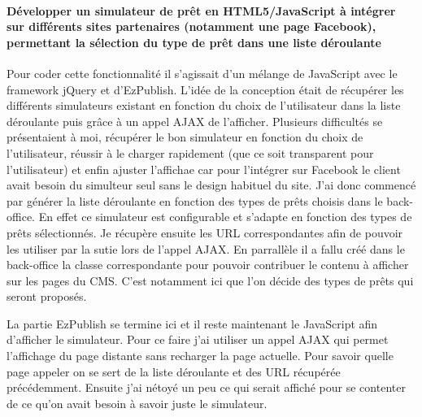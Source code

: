 \documentclass[a4paper,11pt,twoside]{report}
\begin{document}
      \paragraph*{Développer un simulateur de prêt en HTML5/JavaScript à intégrer sur différents sites partenaires (notamment une page Facebook), permettant la sélection du type de prêt dans une liste déroulante}
      Pour coder cette fonctionnalité il s'agissait d'un mélange de JavaScript avec le framework jQuery et d'EzPublish. L'idée de la conception était de récupérer les différents simulateurs existant en fonction du choix de l'utilisateur dans la liste déroulante puis grâce à un appel AJAX de l'afficher. Plusieurs difficultés se présentaient à moi, récupérer le bon simulateur en fonction du choix de l'utilisateur, réussir à le charger rapidement (que ce soit transparent pour l'utilisateur) et enfin ajuster l'affichae car pour l'intégrer sur Facebook le client avait besoin du simulteur seul sans le design habituel du site. J'ai donc commencé par générer la liste déroulante en fonction des types de prêts choisis dans le back-office. En effet ce simulateur est configurable et s'adapte en fonction des types de prêts sélectionnés. Je récupère ensuite les URL correspondantes afin de pouvoir les utiliser par la sutie lors de l'appel AJAX. En parrallèle il a fallu créé dans le back-office la classe correspondante pour pouvoir contribuer le contenu à afficher sur les pages du CMS. C'est notamment ici que l'on décide des types de prêts qui seront proposés.
      
      La partie EzPublish se termine ici et il reste maintenant le JavaScript afin d'afficher le simulateur. Pour ce faire j'ai utiliser un appel AJAX qui permet l'affichage du page distante sans recharger la page actuelle. Pour savoir quelle page appeler on se sert de la liste déroulante et des URL récupérée précédemment. Ensuite j'ai nétoyé un peu ce qui serait affiché pour se contenter de ce qu'on avait besoin à savoir juste le simulateur.
      
\end{document}
